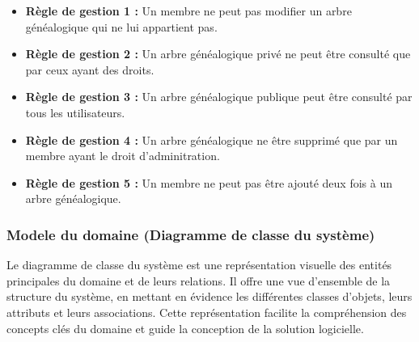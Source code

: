 \begin{itemize}
  \item \textbf{Règle de gestion 1 :} Un membre ne peut pas modifier un arbre généalogique qui ne lui appartient pas.
  \item \textbf{Règle de gestion 2 :} Un arbre généalogique privé ne peut être consulté que par ceux ayant des droits.
  \item \textbf{Règle de gestion 3 :} Un arbre généalogique publique peut être consulté par tous les utilisateurs.
  \item \textbf{Règle de gestion 4 :} Un arbre généalogique ne être supprimé que par un  membre ayant le droit d'adminitration.
  \item \textbf{Règle de gestion 5 :} Un membre ne peut pas être ajouté deux fois à un arbre généalogique.
\end{itemize}

\subsubsection{Modele du domaine (Diagramme de classe du système)}
Le diagramme de classe du système est une représentation visuelle des
entités principales du domaine et de leurs relations. Il offre une vue
d'ensemble de la structure du système, en mettant en évidence les différentes
classes d'objets, leurs attributs et leurs associations. Cette représentation
facilite la compréhension des concepts clés du domaine et guide la conception
de la solution logicielle.


